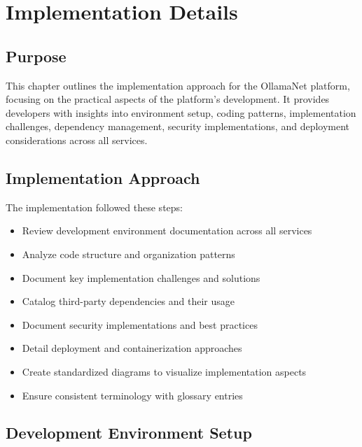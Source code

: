 \chapter{Implementation Details}

\section{Purpose}
This chapter outlines the implementation approach for the OllamaNet platform, focusing on the practical aspects of the platform's development. It provides developers with insights into environment setup, coding patterns, implementation challenges, dependency management, security implementations, and deployment considerations across all services.

\section{Implementation Approach}
The implementation followed these steps:
\begin{itemize}
    \item Review development environment documentation across all services
    \item Analyze code structure and organization patterns
    \item Document key implementation challenges and solutions
    \item Catalog third-party dependencies and their usage
    \item Document security implementations and best practices
    \item Detail deployment and containerization approaches
    \item Create standardized diagrams to visualize implementation aspects
    \item Ensure consistent terminology with glossary entries
\end{itemize}

\section{Development Environment Setup}

